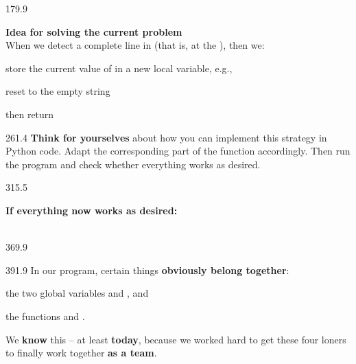 \documentclass{aslab}
\begin{document}
\begin{region}[pitch=13.5]{179.9}
\begin{ptasks}[start=3]
\item \textbf{Idea for solving the current problem}\\
  When we detect a complete line in  (that is, at the
  \code{\n}), then we:
  \begin{Romans}
  \item store the current value of  in a new local variable,
    e.g., 
  \item reset  to the empty string 
  \item then return 
  \end{Romans}
\end{ptasks}
\end{region}

\begin{region}[x=74.7,right=0,pitch=13.4]{261.4}
\textbf{Think for yourselves} about how you can implement this strategy in
Python code. Adapt the corresponding part of the function
 accordingly. Then run the program and check whether
everything works as desired.
\end{region}

\begin{region}[pitch=13.55]{315.5}
\begin{ptasks}[start=4]
\item \textbf{If everything now works as desired:}\\
  \\
\end{ptasks}
\end{region}

\begin{region}{369.9}
\end{region}

\begin{region}[pitch=13.9]{391.9}
In our program, certain things \textbf{obviously belong together}:
\begin{dashlist}
\item the two global variables  and , and
\item the functions  and .
\end{dashlist}
We \textbf{know} this -- at least \textbf{today}, because we worked hard to
get these four loners to finally work together \textbf{as a team}.
\end{region}
\end{document}
